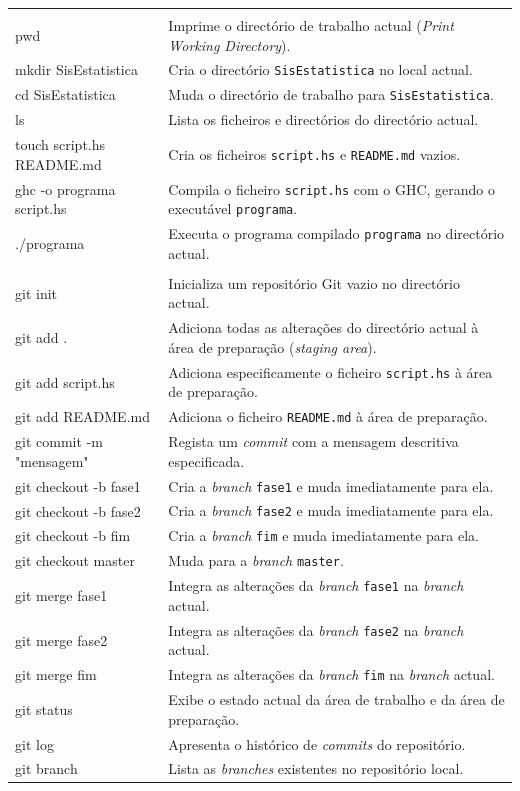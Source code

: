 \documentclass[12pt, a4paper, oneside]{report}
\begin{document}
\begin{longtable}{>{\ttfamily}p{5.5cm} p{8cm}}
\multicolumn{2}{l}{\bfseries Comandos Linux} \\
\addlinespace
pwd & Imprime o directório de trabalho actual (\textit{Print Working Directory}). \\
mkdir SisEstatistica & Cria o directório \texttt{SisEstatistica} no local actual. \\
cd SisEstatistica & Muda o directório de trabalho para \texttt{SisEstatistica}. \\
ls & Lista os ficheiros e directórios do directório actual. \\
touch script.hs README.md & Cria os ficheiros \texttt{script.hs} e \texttt{README.md} vazios. \\
ghc -o programa script.hs & Compila o ficheiro \texttt{script.hs} com o GHC, gerando o executável \texttt{programa}. \\
./programa & Executa o programa compilado \texttt{programa} no directório actual. \\
\addlinespace
\multicolumn{2}{l}{\bfseries Comandos Git} \\
\addlinespace
git init & Inicializa um repositório Git vazio no directório actual. \\
git add . & Adiciona todas as alterações do directório actual à área de preparação (\textit{staging area}). \\
git add script.hs & Adiciona especificamente o ficheiro \texttt{script.hs} à área de preparação. \\
git add README.md & Adiciona o ficheiro \texttt{README.md} à área de preparação. \\
git commit -m "mensagem" & Regista um \textit{commit} com a mensagem descritiva especificada. \\
git checkout -b fase1 & Cria a \textit{branch} \texttt{fase1} e muda imediatamente para ela. \\
git checkout -b fase2 & Cria a \textit{branch} \texttt{fase2} e muda imediatamente para ela. \\
git checkout -b fim & Cria a \textit{branch} \texttt{fim} e muda imediatamente para ela. \\
git checkout master & Muda para a \textit{branch} \texttt{master}. \\
git merge fase1 & Integra as alterações da \textit{branch} \texttt{fase1} na \textit{branch} actual. \\
git merge fase2 & Integra as alterações da \textit{branch} \texttt{fase2} na \textit{branch} actual. \\
git merge fim & Integra as alterações da \textit{branch} \texttt{fim} na \textit{branch} actual. \\
git status & Exibe o estado actual da área de trabalho e da área de preparação. \\
git log & Apresenta o histórico de \textit{commits} do repositório. \\
git branch & Lista as \textit{branches} existentes no repositório local. \\

\end{longtable}
\end{document}
